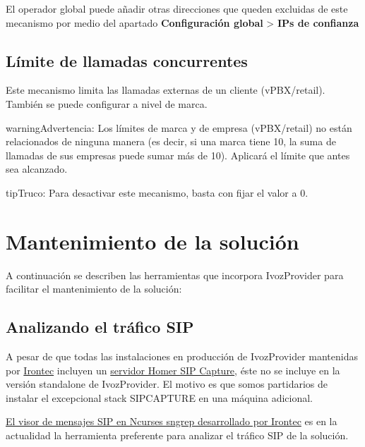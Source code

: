 \documentclass[letterpaper,10pt,spanish]{sphinxmanual}
\begin{document}
El operador global puede añadir otras direcciones que queden excluidas de este mecanismo por medio del apartado \textbf{Configuración global} \textgreater{} \textbf{IPs de confianza}

\noindent{}


\section{Límite de llamadas concurrentes}
\label{security/index:concurrent-call-limit}
Este mecanismo limita las llamadas externas de un cliente (vPBX/retail). También se puede configurar a nivel de marca.

\begin{notice}{warning}{Advertencia:}
Los límites de marca y de empresa (vPBX/retail) no están relacionados de ninguna manera (es decir, si una marca tiene 10, la suma de llamadas de sus empresas puede sumar más de 10). Aplicará el límite que antes sea alcanzado.
\end{notice}

\begin{notice}{tip}{Truco:}
Para desactivar este mecanismo, basta con fijar el valor a 0.
\end{notice}


\chapter{Mantenimiento de la solución}
\label{maintenance/index::doc}\label{maintenance/index:maintenance-and-troubleshooting}
A continuación se describen las herramientas que incorpora IvozProvider para facilitar el mantenimiento de la solución:


\section{Analizando el tráfico SIP}
\label{maintenance/sip_captures:analyzing-sip-traffic}\label{maintenance/sip_captures::doc}
A pesar de que todas las instalaciones en producción de IvozProvider mantenidas por \href{https://www.irontec.com}{Irontec} incluyen un \href{https://www.sipcapture.org/}{servidor Homer SIP Capture}, éste no se incluye en la versión standalone de IvozProvider. El motivo es que somos partidarios de instalar el excepcional stack SIPCAPTURE en una máquina adicional.

\href{https://github.com/irontec/sngrep}{El visor de mensajes SIP en Ncurses sngrep desarrollado por Irontec} es en la actualidad la herramienta preferente para analizar el tráfico SIP de la solución.
\end{document}
